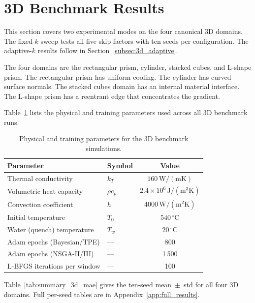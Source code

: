 \section{3D Benchmark Results}
\label{sec:results_3d}

This section covers two experimental modes on the four canonical 3D domains.
The fixed-$k$ sweep tests all five skip factors with ten seeds per configuration.
The adaptive-$k$ results follow in Section~\ref{subsec:3d_adaptive}.

The four domains are the rectangular prism, cylinder, stacked cubes, and
L-shape prism.
The rectangular prism has uniform cooling.
The cylinder has curved surface normals.
The stacked cubes domain has an internal material interface.
The L-shape prism has a reentrant edge that concentrates the gradient.

Table~\ref{tab:3d_params} lists the physical and training parameters used
across all 3D benchmark runs.

\begin{table}[H]
\centering
\caption{Physical and training parameters for the 3D benchmark simulations.}
\label{tab:3d_params}
\small
\begin{tabular}{llc}
\toprule
Parameter & Symbol & Value \\
\midrule
Thermal conductivity        & $k_T$      & $160\,\mathrm{W/(mK)}$ \\
Volumetric heat capacity    & $\rho c_p$ & $2.4\times10^6\,\mathrm{J/(m^3K)}$ \\
Convection coefficient      & $h$        & $4000\,\mathrm{W/(m^2K)}$ \\
Initial temperature         & $T_0$      & $540\,^\circ\mathrm{C}$ \\
Water (quench) temperature  & $T_w$      & $20\,^\circ\mathrm{C}$ \\
\midrule
Adam epochs (Bayesian/TPE)  & ---        & 800 \\
Adam epochs (NSGA-II/III)   & ---        & 1\,500 \\
L-BFGS iterations per window& ---        & 100 \\
\bottomrule
\end{tabular}
\end{table}

Table~\ref{tab:summary_3d_mae} gives the ten-seed mean~$\pm$~std for all four
3D domains.
Full per-seed tables are in Appendix~\ref{app:full_results}.


